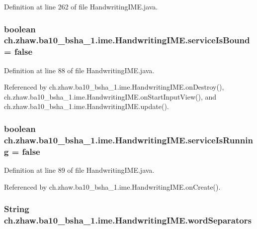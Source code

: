 Definition at line 262 of file HandwritingIME.java.\hypertarget{classch_1_1zhaw_1_1ba10__bsha__1_1_1ime_1_1HandwritingIME_a9d9ecc20c8af30a04dfaa832cd7da89b}{
\subsubsection[{serviceIsBound}]{\setlength{\rightskip}{0pt plus 5cm}boolean {\bf ch.zhaw.ba10\_\-bsha\_\-1.ime.HandwritingIME.serviceIsBound} = false}}
\label{classch_1_1zhaw_1_1ba10__bsha__1_1_1ime_1_1HandwritingIME_a9d9ecc20c8af30a04dfaa832cd7da89b}


Definition at line 88 of file HandwritingIME.java.

Referenced by ch.zhaw.ba10\_\-bsha\_\-1.ime.HandwritingIME.onDestroy(), ch.zhaw.ba10\_\-bsha\_\-1.ime.HandwritingIME.onStartInputView(), and ch.zhaw.ba10\_\-bsha\_\-1.ime.HandwritingIME.update().\hypertarget{classch_1_1zhaw_1_1ba10__bsha__1_1_1ime_1_1HandwritingIME_a2ec39f4494a222882ffb6a09419accd8}{
\subsubsection[{serviceIsRunning}]{\setlength{\rightskip}{0pt plus 5cm}boolean {\bf ch.zhaw.ba10\_\-bsha\_\-1.ime.HandwritingIME.serviceIsRunning} = false}}
\label{classch_1_1zhaw_1_1ba10__bsha__1_1_1ime_1_1HandwritingIME_a2ec39f4494a222882ffb6a09419accd8}


Definition at line 89 of file HandwritingIME.java.

Referenced by ch.zhaw.ba10\_\-bsha\_\-1.ime.HandwritingIME.onCreate().\hypertarget{classch_1_1zhaw_1_1ba10__bsha__1_1_1ime_1_1HandwritingIME_a23ac28ca44ad5920e88c7671b7a9f2d1}{
\subsubsection[{wordSeparators}]{\setlength{\rightskip}{0pt plus 5cm}String {\bf ch.zhaw.ba10\_\-bsha\_\-1.ime.HandwritingIME.wordSeparators}}}
\label{classch_1_1zhaw_1_1ba10__bsha__1_1_1ime_1_1HandwritingIME_a23ac28ca44ad5920e88c7671b7a9f2d1}


